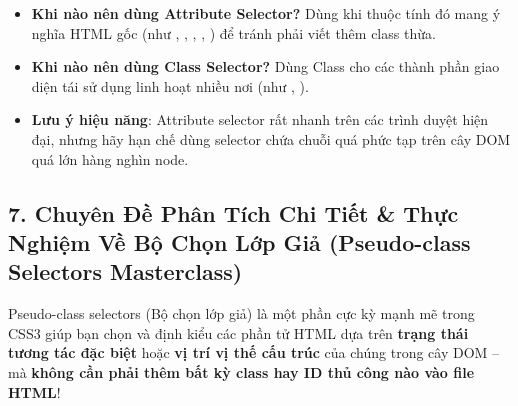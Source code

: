 \begin{tipBox}
\begin{itemize}[leftmargin=1.5em, itemsep=3pt, parsep=0pt]
    \item \textbf{Khi nào nên dùng Attribute Selector?} Dùng khi thuộc tính đó mang ý nghĩa HTML gốc (như , , , , ) để tránh phải viết thêm class thừa.
    \item \textbf{Khi nào nên dùng Class Selector?} Dùng Class cho các thành phần giao diện tái sử dụng linh hoạt nhiều nơi (như , ).
    \item \textbf{Lưu ý hiệu năng}: Attribute selector rất nhanh trên các trình duyệt hiện đại, nhưng hãy hạn chế dùng selector chứa chuỗi quá phức tạp \codeinline{[attr*="..."]} trên cây DOM quá lớn hàng nghìn node.
\end{itemize}
\end{tipBox}

\subsection{7. Chuyên Đề Phân Tích Chi Tiết \& Thực Nghiệm Về Bộ Chọn Lớp Giả (Pseudo-class Selectors Masterclass)}

Pseudo-class selectors (Bộ chọn lớp giả) là một phần cực kỳ mạnh mẽ trong CSS3 giúp bạn chọn và định kiểu các phần tử HTML dựa trên \textbf{trạng thái tương tác đặc biệt} hoặc \textbf{vị trí vị thế cấu trúc} của chúng trong cây DOM -- mà \textbf{không cần phải thêm bất kỳ class hay ID thủ công nào vào file HTML}!

